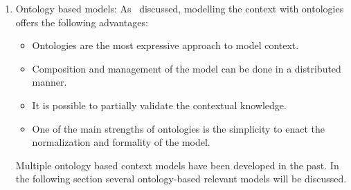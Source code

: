 \begin{enumerate}
  \item {Ontology based models: As~\citet{strang_context_2004} discussed, modelling 
  the context with ontologies offers the following advantages:
  \begin{itemize}
    \item Ontologies are the most expressive approach to model context.
    \item Composition and management of the model can be done in a distributed 
    manner.
    \item It is possible to partially validate the contextual knowledge.
    \item One of the main strengths of ontologies is the simplicity to enact 
    the normalization and formality of the model.
  \end{itemize}
  Multiple ontology based context models have been developed in the past. In the 
  following section several ontology-based relevant models will be discussed.}
  
\end{enumerate}